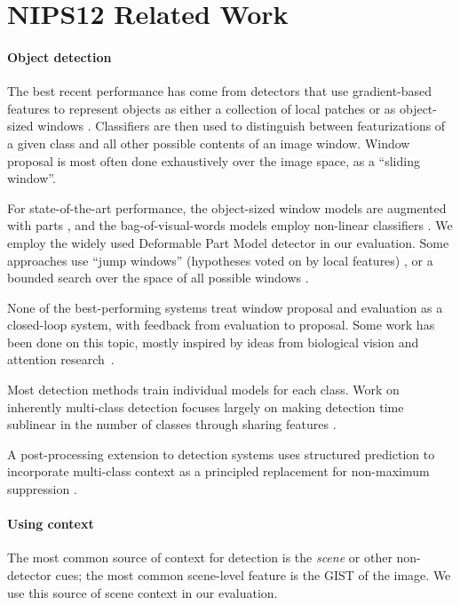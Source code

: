 \section{NIPS12 Related Work}

\paragraph{Object detection}
The best recent performance has come from detectors that use gradient-based features to represent objects as either a collection of local patches or as object-sized windows \cite{Dalal2005,Lowe2004}.
Classifiers are then used to distinguish between featurizations of a given class and all other possible contents of an image window.
Window proposal is most often done exhaustively over the image space, as a ``sliding window''.

For state-of-the-art performance, the object-sized window models are augmented with parts \cite{Felzenszwalb2010a}, and the bag-of-visual-words models employ non-linear classifiers \cite{Vedaldi2009}.
We employ the widely used Deformable Part Model detector \cite{Felzenszwalb2010a} in our evaluation.
Some approaches use ``jump windows'' (hypotheses voted on by local features) \cite{Vedaldi2009,Vijayanarasimhan2011}, or a bounded search over the space of all possible windows \cite{Lampert2008a}.

None of the best-performing systems treat window proposal and evaluation as a closed-loop system, with feedback from evaluation to proposal.
Some work has been done on this topic, mostly inspired by ideas from biological vision and attention research~\cite{Butko2009,Vogel2008}.

Most detection methods train individual models for each class.
Work on inherently multi-class detection focuses largely on making detection time sublinear in the number of classes through sharing features \cite{Torralba2007,Fan2005}.

A post-processing extension to detection systems uses structured prediction to incorporate multi-class context as a principled replacement for non-maximum suppression \cite{Desai2009}.

\paragraph{Using context}
The most common source of context for detection is the \emph{scene} or other non-detector cues; the most common scene-level feature is the GIST \cite{Oliva-IJCV-2001} of the image.
We use this source of scene context in our evaluation.

